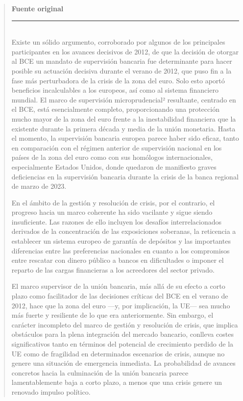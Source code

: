 \documentclass[10pt,a4paper]{article}
\newenvironment{specialblock}[1]{%
      \begin{quote} %
      \small %
      \noindent\textbf{#1}\\[-0.3em] %
      \rule{\linewidth}{0.4pt}\\[0.6em]}{
      \end{quote}}
\begin{document}
{\begin{specialblock}{Fuente original}
    Existe un sólido argumento, corroborado por algunos de los principales participantes en los avances decisivos de 2012, de que la decisión de otorgar al BCE un mandato de supervisión bancaria fue determinante para hacer posible su actuación decisiva durante el verano de 2012, que puso fin a la fase más perturbadora de la crisis de la zona del euro. Solo esto aportó beneficios incalculables a los europeos, así como al sistema financiero mundial. El marco de supervisión microprudencial² resultante, centrado en el BCE, está esencialmente completo, proporcionando una protección mucho mayor de la zona del euro frente a la inestabilidad financiera que la existente durante la primera década y media de la unión monetaria. Hasta el momento, la supervisión bancaria europea parece haber sido eficaz, tanto en comparación con el régimen anterior de supervisión nacional en los países de la zona del euro como con sus homólogos internacionales, especialmente Estados Unidos, donde quedaron de manifiesto graves deficiencias en la supervisión bancaria durante la crisis de la banca regional de marzo de 2023.
    
    En el ámbito de la gestión y resolución de crisis, por el contrario, el progreso hacia un marco coherente ha sido vacilante y sigue siendo insuficiente. Las razones de ello incluyen los desafíos interrelacionados derivados de la concentración de las exposiciones soberanas, la reticencia a establecer un sistema europeo de garantía de depósitos y las importantes diferencias entre las preferencias nacionales en cuanto a los compromisos entre rescatar con dinero público a bancos en dificultades o imponer el reparto de las cargas financieras a los acreedores del sector privado.
    
    El marco supervisor de la unión bancaria, más allá de su efecto a corto plazo como facilitador de las decisiones críticas del BCE en el verano de 2012, hace que la zona del euro —y, por implicación, la UE— sea mucho más fuerte y resiliente de lo que era anteriormente. Sin embargo, el carácter incompleto del marco de gestión y resolución de crisis, que implica obstáculos para la plena integración del mercado bancario, conlleva costes significativos tanto en términos del potencial de crecimiento perdido de la UE como de fragilidad en determinados escenarios de crisis, aunque no genere una situación de emergencia inmediata. La probabilidad de avances concretos hacia la culminación de la unión bancaria parece lamentablemente baja a corto plazo, a menos que una crisis genere un renovado impulso político.
    

\end{specialblock}}
\end{document}
